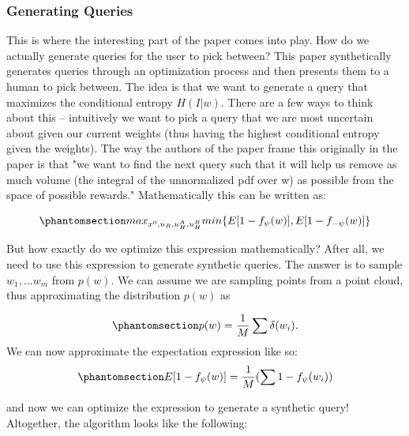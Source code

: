 \documentclass[
  letterpaper,
  numbers=noenddot,
  DIV=11]{scrreprt}
\theoremstyle{definition}
\theoremstyle{plain}
\theoremstyle{plain}
\theoremstyle{remark}
\begin{document}
\subsubsection*{Generating Queries}\label{generating-queries}

This is where the interesting part of the paper comes into play. How do
we actually generate queries for the user to pick between? This paper
synthetically generates queries through an optimization process and then
presents them to a human to pick between. The idea is that we want to
generate a query that maximizes the conditional entropy \(H(I|w)\).
There are a few ways to think about this -- intuitively we want to pick
a query that we are most uncertain about given our current weights (thus
having the highest conditional entropy given the weights). The way the
authors of the paper frame this originally in the paper is that "we want
to find the next query such that it will help us remove as much volume
(the integral of the unnormalized pdf over w) as possible from the space
of possible rewards." Mathematically this can be written as:

\begin{equation}\phantomsection\label{eq-eq3.41}{max_{x^0, u_R, u_H^A, u_H^B} min\{E[1-f_{\psi}(w)], E[1 - f_{-\psi}(w)]\}}\end{equation}

But how exactly do we optimize this expression mathematically? After
all, we need to use this expression to generate synthetic queries. The
answer is to sample \(w_1, ... w_m\) from \(p(w)\). We can assume we are
sampling points from a point cloud, thus approximating the distribution
\(p(w)\) as

\begin{equation}\phantomsection\label{eq-eq3.42}{p(w) = \frac{1}{M} \sum \delta (w_i).}\end{equation}
We can now approximate the expectation expression like so:
\begin{equation}\phantomsection\label{eq-eq3.43}{E[1 - f_{\psi}(w)] = \frac{1}{M} (\sum 1 - f_{\psi}(w_i))}\end{equation}

and now we can optimize the expression to generate a synthetic query!
Altogether, the algorithm looks like the following:
\end{document}
